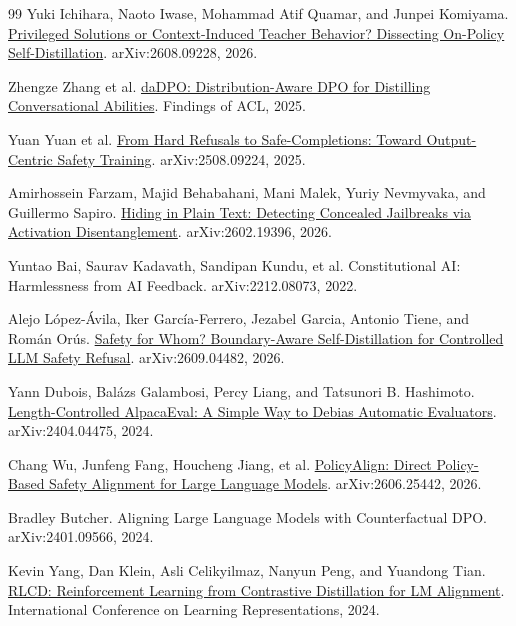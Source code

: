 \documentclass[11pt]{article}
\begin{document}
\begin{thebibliography}{99}
Yuki Ichihara, Naoto Iwase, Mohammad Atif Quamar, and Junpei Komiyama.
\newblock \href{https://arxiv.org/abs/2608.09228}{Privileged Solutions or Context-Induced Teacher Behavior? Dissecting On-Policy Self-Distillation}.
\newblock arXiv:2608.09228, 2026.

Zhengze Zhang et al.
\newblock \href{https://aclanthology.org/2025.findings-acl.796/}{daDPO: Distribution-Aware DPO for Distilling Conversational Abilities}.
\newblock Findings of ACL, 2025.

Yuan Yuan et al.
\newblock \href{https://arxiv.org/abs/2508.09224}{From Hard Refusals to Safe-Completions: Toward Output-Centric Safety Training}.
\newblock arXiv:2508.09224, 2025.

Amirhossein Farzam, Majid Behabahani, Mani Malek, Yuriy Nevmyvaka, and Guillermo Sapiro.
\newblock \href{https://arxiv.org/abs/2602.19396}{Hiding in Plain Text: Detecting Concealed Jailbreaks via Activation Disentanglement}.
\newblock arXiv:2602.19396, 2026.

Yuntao Bai, Saurav Kadavath, Sandipan Kundu, et al.
\newblock Constitutional AI: Harmlessness from AI Feedback.
\newblock arXiv:2212.08073, 2022.

Alejo López-Ávila, Iker García-Ferrero, Jezabel Garcia, Antonio Tiene, and Román Orús.
\newblock \href{https://arxiv.org/abs/2609.04482}{Safety for Whom? Boundary-Aware Self-Distillation for Controlled LLM Safety Refusal}.
\newblock arXiv:2609.04482, 2026.

Yann Dubois, Balázs Galambosi, Percy Liang, and Tatsunori B. Hashimoto.
\newblock \href{https://arxiv.org/abs/2404.04475}{Length-Controlled AlpacaEval: A Simple Way to Debias Automatic Evaluators}.
\newblock arXiv:2404.04475, 2024.

Chang Wu, Junfeng Fang, Houcheng Jiang, et al.
\newblock \href{https://arxiv.org/abs/2606.25442}{PolicyAlign: Direct Policy-Based Safety Alignment for Large Language Models}.
\newblock arXiv:2606.25442, 2026.

Bradley Butcher.
\newblock Aligning Large Language Models with Counterfactual DPO.
\newblock arXiv:2401.09566, 2024.

Kevin Yang, Dan Klein, Asli Celikyilmaz, Nanyun Peng, and Yuandong Tian.
\newblock \href{https://proceedings.iclr.cc/paper_files/paper/2024/hash/5bd09a559a8c8e230697107b0f353d39-Abstract-Conference.html}{RLCD: Reinforcement Learning from Contrastive Distillation for LM Alignment}.
\newblock International Conference on Learning Representations, 2024.


\end{thebibliography}
\end{document}
